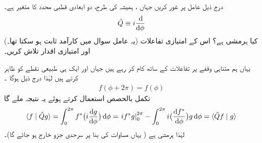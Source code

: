درج ذیل عامل پر غور کریں جہاں    ، ہمیشہ کی طرح،  دو ابعادی قطبی محدد کا      متغیر ہے۔
\begin{align}
	\hat{Q} \equiv i\frac{\dif }{\dif \phi}
\end{align}
(یہ عامل سوال  میں کارآمد ثابت ہو سکتا تھا۔)  کیا  ہرمشی ہے؟ اس کے امتیازی تفاعلات اور امتیازی اقدار تلاش کریں۔

 \quad
 یہاں ہم متناہی وقفے   پر تفاعلات   کے ساتھ کام کر رہے ہیں جہاں  اور  ایک ہی طبیعی نقطے  کو ظاہر کرتے ہیں  لہٰذا  درج ذیل ہوگا ۔
\begin{align}\label{مساوات_قواعد_دہراتا_تفاعل}
	f(\phi + 2\pi) = f(\phi)
\end{align}
تکمل بالحصص استعمال کرتے ہوئے یہ نتیجہ ملے گا
\begin{align*}
	\langle f\mid\hat{Q}g \rangle = \int_{0}^{2\pi}f^{*}\big(i\frac{\dif g}{\dif \phi}\big)\dif \phi = \left. if^{*}g\right\vert^{2\pi}_{0} - \int_{0}^{2\pi}i\big(\frac{\dif f^*}{\dif \phi}\big)g\dif \phi = \langle \hat{Q}f\mid g \rangle
\end{align*}
لہٰذا  ہرمشی ہے ( یہاں مساوات  کی بنا پر سرحدی جزو خارج ہو جائے گا)۔

